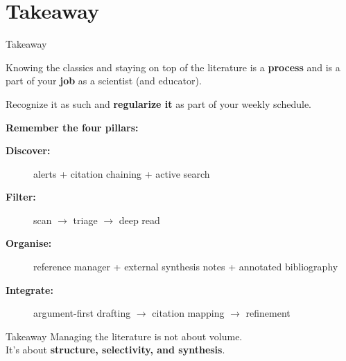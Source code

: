 \documentclass{beamer}
\begin{document}
\section{Takeaway}
\begin{frame}{Takeaway}

  \footnotesize

  Knowing the classics and staying on top of the literature is a \textbf{process} 
  and is a part of your \textbf{job} as a scientist (and educator).

  \smallskip
  Recognize it as such and \textbf{regularize it} as part of your weekly schedule.

  \medskip
  \textbf{Remember the four pillars:}
  \begin{description}
     \item[\textbf{Discover:}] alerts + citation chaining + active search 
    \item[\textbf{Filter:}] scan $\rightarrow$ triage $\rightarrow$ deep read
    \item[\textbf{Organise:}] reference manager + external synthesis notes + annotated bibliography
    \item[\textbf{Integrate:}] argument-first drafting $\rightarrow$ citation mapping $\rightarrow$ refinement
  \end{description}

  \medskip
  \begin{block}{Takeaway}
    Managing the literature is not about volume.\\
    It's about \textbf{structure, selectivity, and synthesis}.
  \end{block}

\end{frame}
\end{document}

